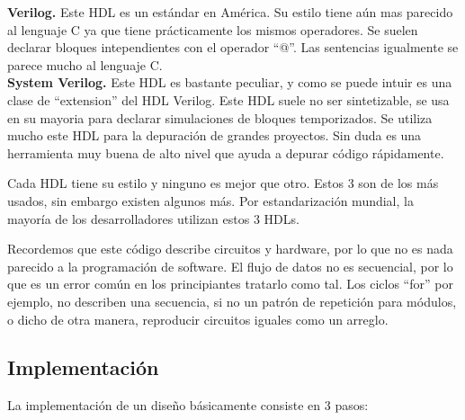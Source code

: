 \documentclass[twoside,spanish,ESP,MSc]{plantillaLabUPV}
\theoremstyle{definition}
\begin{document}
\checkmark\textbf{Verilog.} Este HDL es un estándar en América. Su estilo tiene aún mas parecido al lenguaje C ya que tiene prácticamente los mismos operadores. Se suelen declarar bloques intependientes con el operador ``@''. Las sentencias igualmente se parece mucho al lenguaje C.\\


\checkmark\textbf{System Verilog.} Este HDL es bastante peculiar, y como se puede intuir es una clase de ``extension'' del HDL Verilog. Este HDL suele no ser sintetizable, se usa en su mayoria para declarar simulaciones de bloques temporizados. Se utiliza mucho este HDL para la depuración de grandes proyectos. Sin duda es una herramienta muy buena de alto nivel que ayuda a depurar código rápidamente.




Cada HDL tiene su estilo y ninguno es mejor que otro. Estos 3 son de los más usados, sin embargo existen algunos más. Por estandarización mundial, la mayoría de los desarrolladores utilizan estos 3 HDLs.

Recordemos que este código describe circuitos y hardware, por lo que no es nada parecido a la programación de software. El flujo de datos no es secuencial, por lo que es un error común en los principiantes tratarlo como tal. Los ciclos ``for'' por ejemplo, no describen una secuencia, si no un patrón de repetición para módulos, o dicho de otra manera, reproducir circuitos iguales como un arreglo.

\subsection{Implementación}%

La implementación de un diseño básicamente consiste en 3 pasos:

%
\end{document}

